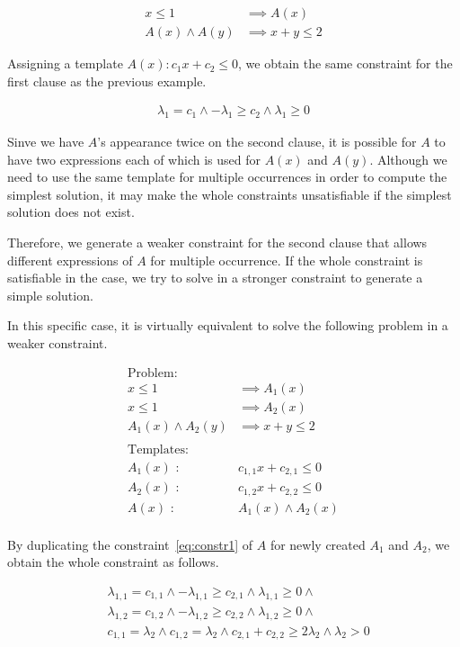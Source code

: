 \documentclass[a4paper,12pt]{article}
\begin{document}
\begin{align*}
x \leq 1 & \implies A(x) \\
A(x) \wedge A(y) & \implies x+y \leq 2
\end{align*}

Assigning a template
$A(x) : c_1 x + c_2 \leq 0$, we obtain the same
constraint for the first clause as the previous example.

\begin{align} \label{eq:constr1}
\lambda_1 = c_1 \wedge - \lambda_1 \geq c_2 \wedge \lambda_1 \geq 0
\end{align}

Sinve we have $A$'s appearance twice on the second clause,
it is possible for $A$ to have two expressions each of which is used
for $A(x)$ and $A(y)$. Although we need to use the same template for
multiple occurrences in order to compute the simplest solution,
it may make the whole constraints unsatisfiable if the simplest
solution does not exist.

Therefore, we generate a weaker constraint for the second clause that
allows different expressions of $A$ for multiple occurrence. If the
whole constraint is satisfiable in the case, we try to solve in a
stronger constraint to generate a simple solution.

In this specific case, it is virtually equivalent to solve the
following problem in a weaker constraint.

\begin{align*}
\text{Problem:} \\
x \leq 1 & \implies A_1(x) \\
x \leq 1 & \implies A_2(x) \\
A_1(x) \wedge A_2(y) & \implies x+y \leq 2 \\
\\
\text{Templates:} \\
A_1(x) \text{ : } & c_{1,1} x + c_{2,1} \leq 0 \\
A_2(x) \text{ : } & c_{1,2} x + c_{2,2} \leq 0 \\
A(x) \text{ : } & A_1(x) \wedge A_2(x) \\
\end{align*}

By duplicating the constraint~\ref{eq:constr1} of $A$ for newly
created $A_1$ and $A_2$, we obtain the whole constraint as follows.

\begin{align*}
& \lambda_{1,1} = c_{1,1} \wedge - \lambda_{1,1} \geq c_{2,1} \wedge \lambda_{1,1} \geq 0 \wedge \\
& \lambda_{1,2} = c_{1,2} \wedge - \lambda_{1,2} \geq c_{2,2} \wedge \lambda_{1,2} \geq 0 \wedge \\
& c_{1,1} = \lambda_2 \wedge c_{1,2} = \lambda_2 \wedge c_{2,1} + c_{2,2} \geq 2 \lambda_2 \wedge \lambda_2 > 0
\end{align*}
\end{document}
